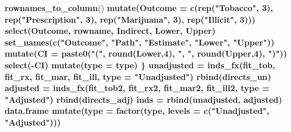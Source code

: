 \documentclass[]{DissertateUSU}
\newenvironment{Shaded}{\begin{snugshade}}{\end{snugshade}}
\newcommand{\KeywordTok}[1]{\textcolor[rgb]{0.13,0.29,0.53}{\textbf{#1}}}
\newcommand{\DataTypeTok}[1]{\textcolor[rgb]{0.13,0.29,0.53}{#1}}
\newcommand{\DecValTok}[1]{\textcolor[rgb]{0.00,0.00,0.81}{#1}}
\newcommand{\StringTok}[1]{\textcolor[rgb]{0.31,0.60,0.02}{#1}}
\newcommand{\OperatorTok}[1]{\textcolor[rgb]{0.81,0.36,0.00}{\textbf{#1}}}
\newcommand{\NormalTok}[1]{#1}
\begin{document}
\begin{Shaded}
\begin{Highlighting}[]
{{{{{{{{{{{{{{{{{{{{{\StringTok{    }\KeywordTok{rownames_to_column}\NormalTok{() }\OperatorTok{%>%}
\StringTok{    }\KeywordTok{mutate}\NormalTok{(}\DataTypeTok{Outcome =} \KeywordTok{c}\NormalTok{(}\KeywordTok{rep}\NormalTok{(}\StringTok{"Tobacco"}\NormalTok{, }\DecValTok{3}\NormalTok{), }
                       \KeywordTok{rep}\NormalTok{(}\StringTok{"Prescription"}\NormalTok{, }\DecValTok{3}\NormalTok{),}
                       \KeywordTok{rep}\NormalTok{(}\StringTok{"Marijuana"}\NormalTok{, }\DecValTok{3}\NormalTok{), }
                       \KeywordTok{rep}\NormalTok{(}\StringTok{"Illicit"}\NormalTok{, }\DecValTok{3}\NormalTok{))) }\OperatorTok{%>%}
\StringTok{    }\KeywordTok{select}\NormalTok{(Outcome, rowname, Indirect, Lower, Upper) }\OperatorTok{%>%}
\StringTok{    }\KeywordTok{set_names}\NormalTok{(}\KeywordTok{c}\NormalTok{(}\StringTok{"Outcome"}\NormalTok{, }\StringTok{"Path"}\NormalTok{, }\StringTok{"Estimate"}\NormalTok{, }
                \StringTok{"Lower"}\NormalTok{, }\StringTok{"Upper"}\NormalTok{)) }\OperatorTok{%>%}
\StringTok{    }\KeywordTok{mutate}\NormalTok{(}\DataTypeTok{CI =} \KeywordTok{paste0}\NormalTok{(}\StringTok{"("}\NormalTok{, }\KeywordTok{round}\NormalTok{(Lower,}\DecValTok{4}\NormalTok{), }\StringTok{", "}\NormalTok{, }
                       \KeywordTok{round}\NormalTok{(Upper,}\DecValTok{4}\NormalTok{), }\StringTok{")"}\NormalTok{)) }\OperatorTok{%>%}
\StringTok{    }\KeywordTok{select}\NormalTok{(}\OperatorTok{-}\NormalTok{CI) }\OperatorTok{%>%}
\StringTok{    }\KeywordTok{mutate}\NormalTok{(}\DataTypeTok{type =}\NormalTok{ type)}
\NormalTok{\}}
\NormalTok{unadjusted =}\StringTok{ }\KeywordTok{inds_fx}\NormalTok{(fit_tob, }
\NormalTok{                     fit_rx, }
\NormalTok{                     fit_mar, }
\NormalTok{                     fit_ill, }
                     \DataTypeTok{type =} \StringTok{"Unadjusted"}\NormalTok{) }\OperatorTok{%>%}
\StringTok{  }\KeywordTok{rbind}\NormalTok{(directs_un)}
\NormalTok{adjusted =}\StringTok{ }\KeywordTok{inds_fx}\NormalTok{(fit_tob2, }
\NormalTok{                   fit_rx2, }
\NormalTok{                   fit_mar2, }
\NormalTok{                   fit_ill2, }
                   \DataTypeTok{type =} \StringTok{"Adjusted"}\NormalTok{) }\OperatorTok{%>%}
\StringTok{  }\KeywordTok{rbind}\NormalTok{(directs_adj)}
\NormalTok{inds =}\StringTok{ }\KeywordTok{rbind}\NormalTok{(unadjusted, adjusted) }\OperatorTok{%>%}
\StringTok{  }\NormalTok{data.frame }\OperatorTok{%>%}
\StringTok{  }\KeywordTok{mutate}\NormalTok{(}\DataTypeTok{type =} \KeywordTok{factor}\NormalTok{(type, }
                       \DataTypeTok{levels =} \KeywordTok{c}\NormalTok{(}\StringTok{"Unadjusted"}\NormalTok{, }\StringTok{"Adjusted"}\NormalTok{))) }\OperatorTok{%>%}
}}}}}}}}}}}}}}}}}}}}}}}}}}}}}}}}
\end{Highlighting}
\end{Shaded}
\end{document}
